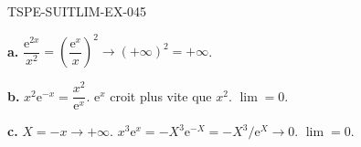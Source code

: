 \begin{corrige}{TSPE-SUITLIM-EX-045}

\textbf{a.} $\dfrac{\mathrm{e}^{2x}}{x^2} = \left(\dfrac{\mathrm{e}^x}{x}\right)^2 \to (+\infty)^2 = \boxed{+\infty}$.

\textbf{b.} $x^2\mathrm{e}^{-x} = \dfrac{x^2}{\mathrm{e}^x}$. $\mathrm{e}^x$ croit plus vite que $x^2$. $\boxed{\lim = 0}$.

\textbf{c.} $X = -x \to +\infty$. $x^3\mathrm{e}^x = -X^3\mathrm{e}^{-X} = -X^3/\mathrm{e}^X \to 0$. $\boxed{\lim = 0}$.

\end{corrige}

